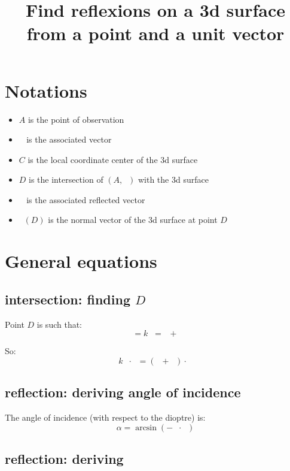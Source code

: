 \documentclass[10pt,a4paper]{article}
\title{Find reflexions on a 3d surface from a point and a unit vector}
\newcommand{\ud}[1]{\underline{#1}}
\DeclareMathOperator{\AD}{\ud{AD}}
\DeclareMathOperator{\AC}{\ud{AC}}
\DeclareMathOperator{\CD}{\ud{CD}}
\DeclareMathOperator{\eA}{\ud{e}_A}
\DeclareMathOperator{\eB}{\ud{e}_B}
\DeclareMathOperator{\n}{\ud{n}}
\begin{document}
\maketitle


\tableofcontents
\newpage



\section{Notations}

\begin{itemize}
    \item $A$ is the point of observation
    \item $\eA$ is the associated vector
    \item $C$ is the local coordinate center of the 3d surface
    \item $D$ is the intersection of $(A, \eA)$ with the 3d surface
    \item $\eB$ is the associated reflected vector
    \item $\n(D)$ is the normal vector of the 3d surface at point $D$
\end{itemize}

\newpage
\section{General equations}


\subsection{intersection: finding $D$}

Point $D$ is such that:
$$
    \AD = k\eA = \AC + \CD
$$

So:
\begin{equation}
    k\eA\cdot\n = (\AC + \CD)\cdot \n
\end{equation}


\subsection{reflection: deriving angle of incidence}

The angle of incidence (with respect to the dioptre) is:
$$
    \alpha = \arcsin(-\eA \cdot \n)
$$

\subsection{reflection: deriving $\eB$}
\end{document}
